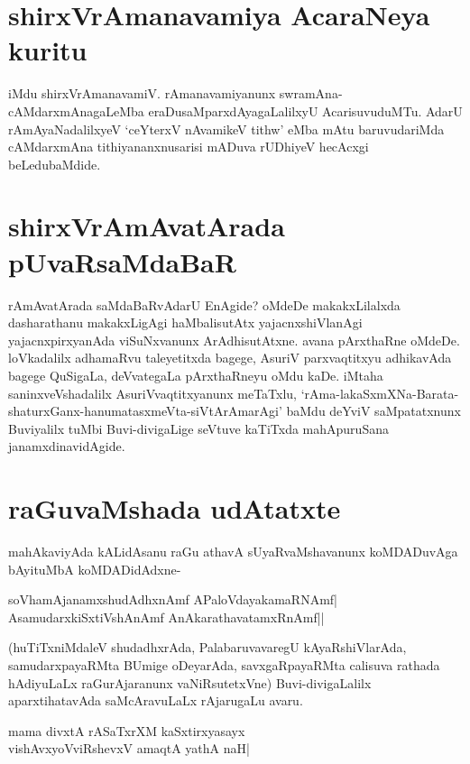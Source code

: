 \section*{shirxVrAmanavamiya AcaraNeya kuritu} 

iMdu shirxVrAmanavamiV. rAmanavamiyanunx swramAna-cAMdarxmAnagaLeMba eraDusaMparxdAyagaLalilxyU AcarisuvuduMTu. AdarU rAmAyaNadalilxyeV `ceYterxV nAvamikeV tithw' eMba mAtu baruvudariMda cAMdarxmAna tithiyananxnusarisi mADuva rUDhiyeV hecAcxgi beLedubaMdide. 

\section*{shirxVrAmAvatArada pUvaRsaMdaBaR}

rAmAvatArada saMdaBaRvAdarU EnAgide? oMdeDe makakxLilalxda dasharathanu makakxLigAgi haMbalisutAtx yajacnxshiVlanAgi yajacnxpirxyanAda viSuNxvanunx ArAdhisutAtxne. avana pArxthaRne oMdeDe. loVkadalilx adhamaRvu taleyetitxda bagege, AsuriV parxvaqtitxyu adhikavAda bagege QuSigaLa, deVvategaLa pArxthaRneyu oMdu kaDe. iMtaha saninxveVshadalilx AsuriVvaqtitxyanunx meTaTxlu, `rAma-lakaSxmXNa-Barata-shaturxGanx-hanumatasxmeVta-siVtArAmarAgi' baMdu deYviV saMpatatxnunx Buviyalilx tuMbi Buvi-divigaLige seVtuve kaTiTxda mahApuruSana janamxdinavidAgide. 

\section*{raGuvaMshada udAtatxte} 

mahAkaviyAda kALidAsanu raGu athavA sUyaRvaMshavanunx koMDADuvAga bAyituMbA koMDADidAdxne- 

\begin{shloka} 
soV\s hamAjanamxshudAdhxnAmf APaloVdayakamaRNAmf|\label{148b}\\ 
AsamudarxkiSxtiVshAnAmf AnAkarathavatamxRnAmf||
\end{shloka} 

(huTiTxniMdaleV shudadhxrAda, PalabaruvavaregU kAyaRshiVlarAda, samudarxpayaRMta BUmige oDeyarAda, savxgaRpayaRMta calisuva rathada hAdiyuLaLx raGurAjaranunx vaNiRsutetxVne) Buvi-divigaLalilx aparxtihatavAda saMcAravuLaLx rAjarugaLu avaru. 

\begin{shloka} 
mama divxtA rASaTxrXM kaSxtirxyasayx\label{148a}\\ 
vishAvxyoVviRshevxV amaqtA yathA naH|
\end{shloka} 

